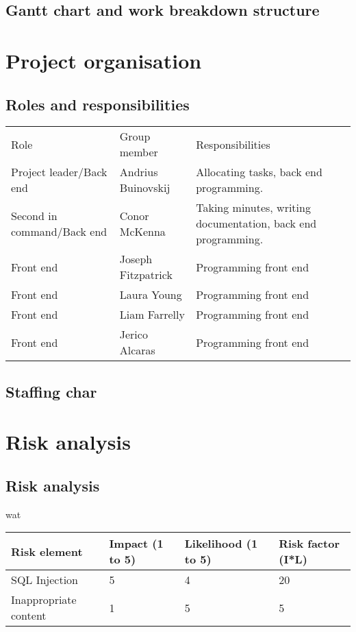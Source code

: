 \documentclass[a4paper, 12pt]{article}
\begin{document}
		\subsection{Gantt chart and work breakdown structure}
	\newpage
	\section{Project organisation}
		\subsection{Roles and responsibilities}
			\begin{tabular}{p{35 mm} p{35 mm} p{54 mm}}
				\toprule
					Role & Group member & Responsibilities \\
					Project leader/Back end & Andrius Buinovskij & Allocating tasks, back end programming. \\
					\midrule
					Second in command/Back end & Conor McKenna & Taking minutes, writing documentation, back end programming. \\
					\midrule
					Front end & Joseph Fitzpatrick & Programming front end \\
					\midrule
					Front end & Laura Young & Programming front end \\
					\midrule
					Front end & Liam Farrelly & Programming front end \\
					\midrule
					Front end & Jerico Alcaras & Programming front end \\
				\bottomrule
			\end{tabular}

		\subsection{Staffing char}

	\newpage
	\section{Risk analysis}
		\subsection{Risk analysis}
			\hfill wat
			\begin{tabular}{p{30 mm} p{30 mm} p{30 mm} p{30 mm}}
				\toprule
					Risk element & Impact (1 to 5) & Likelihood (1 to 5) & Risk factor (I*L) \\
					\midrule
					SQL Injection & 5 & 4 & 20 \\
					\midrule
					Inappropriate content & 1 & 5 & 5 \\
				\bottomrule
			\end{tabular}
\end{document}
